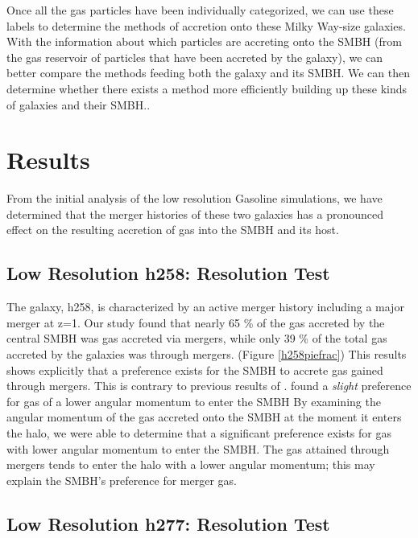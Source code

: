 \documentclass[manuscript]{aastex}
\begin{document}
Once all the gas particles have been individually categorized, we can use these labels to determine the methods of accretion onto these Milky Way-size galaxies. With the information about which particles are accreting onto the SMBH (from the gas reservoir of particles that have been accreted by the galaxy), we can better compare the methods feeding both the galaxy and its SMBH. We can then determine whether there exists a method more efficiently building up these kinds of galaxies and their SMBH..\\

\section{Results} \label{results}

From the initial analysis of the low resolution Gasoline simulations, we have determined that the merger histories of these two galaxies has a pronounced effect on the resulting accretion of gas into the SMBH and its host. 

\subsection{Low Resolution h258: Resolution Test}
	
	The galaxy, h258, is characterized by an active merger history including a major merger at z=1. Our study found that nearly 65 \% of the gas accreted by the central SMBH was gas accreted via mergers, while only 39 \% of the total gas accreted by the galaxies was through mergers. (Figure \ref{h258piefrac}) This results shows explicitly that a preference exists for the SMBH to accrete gas gained through mergers. This is contrary to previous results of \cite{Bellovary2013}. \citep{Bellovary2013} found a \textit{slight} preference for gas of a lower angular momentum to enter the SMBH By examining the angular momentum of the gas accreted onto the SMBH at the moment it enters the halo, we were able to determine that a significant preference exists for gas with lower angular momentum to enter the SMBH. The gas attained through mergers tends to enter the halo with a lower angular momentum; this may explain the SMBH's preference for merger gas. \\


\subsection{Low Resolution h277: Resolution Test}
	
\end{document}
